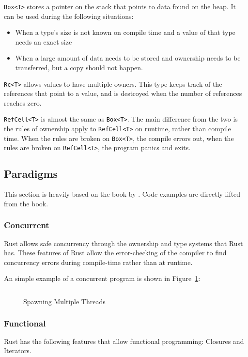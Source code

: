 \documentclass{article}
\newcommand{\rust}[1]{\inputminted{rust}{samples/rust/#1.rs}}
\newcommand{\rustin}[1]{\texttt{#1}}
\begin{document}
  \rustin{Box<T>} stores a pointer on the stack that points to data found on the
  heap. It can be used during the following situations:
  \begin{itemize}
    \item When a type's size is not known on compile time and a value of that
          type needs an exact size
    \item When a large amount of data needs to be stored and ownership needs to
          be transferred, but a copy should not happen.
  \end{itemize}

  \rustin{Rc<T>} allows values to have multiple owners. This type keeps track of
  the references that point to a value, and is destroyed when the number of
  references reaches zero.

  \rustin{RefCell<T>} is almost the same as \rustin{Box<T>}. The main difference
  from the two is the rules of ownership apply to \rustin{RefCell<T>} on
  runtime, rather than compile time. When the rules are broken on
  \rustin{Box<T>}, the compile errors out, when the rules are broken on
  \rustin{RefCell<T>}, the program panics and exits.

  \subsection{Paradigms}

  This section is heavily based on the book  by
  \cite{klabnik_nichols_2018}. Code examples are directly lifted from the book.

  \subsubsection{Concurrent}
  Rust allows safe concurrency through the ownership and type systems that Rust
  has. These features of Rust allow the error-checking of the compiler to find
  concurrency errors during compile-time rather than at runtime.

  An simple example of a concurrent program is shown in Figure~\ref{fig:thread}:

  \begin{figure}[ht]
    \rust{thread}
    \caption{Spawning Multiple Threads}
    \label{fig:thread}
  \end{figure}

  \subsubsection{Functional}
  Rust has the following features that allow functional programming: Closures
  and Iterators.
\end{document}
